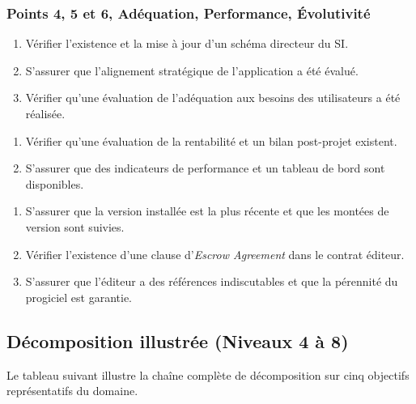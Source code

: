 \subsubsection{Points 4, 5 et 6, Adéquation, Performance, Évolutivité}

\begin{enumerate}[label=4.\arabic*.]
    \item Vérifier l'existence et la mise à jour d'un schéma directeur du SI.
    \item S'assurer que l'alignement stratégique de l'application a été évalué.
    \item Vérifier qu'une évaluation de l'adéquation aux besoins des utilisateurs a été réalisée.
\end{enumerate}
\begin{enumerate}[label=5.\arabic*.]
    \item Vérifier qu'une évaluation de la rentabilité et un bilan post-projet existent.
    \item S'assurer que des indicateurs de performance et un tableau de bord sont disponibles.
\end{enumerate}
\begin{enumerate}[label=6.\arabic*.]
    \item S'assurer que la version installée est la plus récente et que les montées de version sont suivies.
    \item Vérifier l'existence d'une clause d'\textit{Escrow Agreement} dans le contrat éditeur.
    \item S'assurer que l'éditeur a des références indiscutables et que la pérennité du progiciel est garantie.
\end{enumerate}

\subsection{Décomposition illustrée (Niveaux 4 à 8)}

Le tableau suivant illustre la chaîne complète de décomposition sur cinq objectifs représentatifs du domaine.

